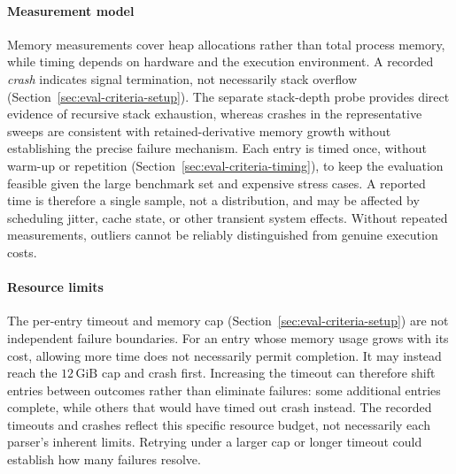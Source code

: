 %

\paragraph{Measurement model}
Memory measurements cover heap allocations rather than total
process memory, while timing depends on hardware and the
execution environment. A recorded \emph{crash} indicates
signal termination, not necessarily stack overflow
(Section~\ref{sec:eval-criteria-setup}).
The separate stack-depth probe provides direct evidence
of recursive stack exhaustion, whereas crashes in the
representative sweeps are consistent with retained-derivative
memory growth without establishing the precise failure mechanism.
Each entry is timed once, without warm-up or repetition
(Section~\ref{sec:eval-criteria-timing}),
to keep the evaluation feasible given the large
benchmark set and expensive stress cases.
A reported time is therefore a single sample,
not a distribution, and may be affected by
scheduling jitter, cache state, or other transient
system effects. Without repeated measurements,
outliers cannot be reliably distinguished
from genuine execution costs.

%

\paragraph{Resource limits}
The per-entry timeout and memory cap
(Section~\ref{sec:eval-criteria-setup}) are not independent failure
boundaries. For an entry whose memory usage grows with its cost,
allowing more time does not necessarily permit completion.
It may instead reach the $12\,\mathrm{GiB}$ cap and crash first.
Increasing the timeout can therefore shift entries between
outcomes rather than eliminate failures: some additional
entries complete, while others that would have timed out crash
instead. The recorded timeouts and crashes reflect this
specific resource budget, not necessarily each parser's
inherent limits. Retrying under a larger cap or longer timeout
could establish how many failures resolve.

%

